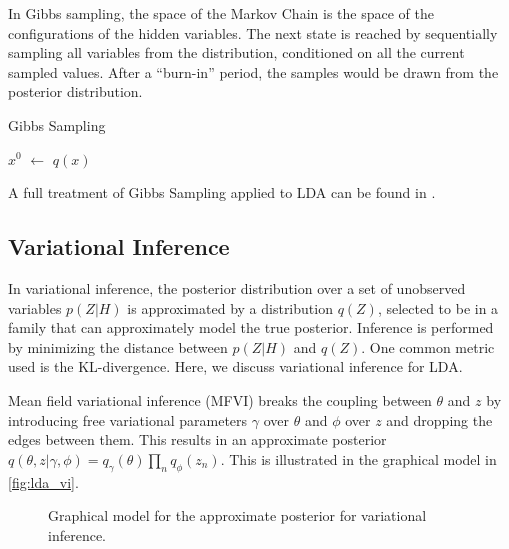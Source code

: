 \documentclass[letterpaper]{article}
\begin{document}
In Gibbs sampling, the space of the Markov Chain is the space of the
configurations of the hidden variables. The next state is reached by
sequentially sampling all variables from the distribution, conditioned
on all the current sampled values. After a ``burn-in'' period, the
samples would be drawn from the posterior distribution.

\begin{algorithm}
\caption{Gibbs Sampling}\label{alg:gibbs}
\begin{algorithmic}[1]
  \State $x^{0}$ $\gets$ $q(x)$
  \EndFor
  \EndFor
\end{algorithmic}
\end{algorithm}

A full treatment of Gibbs Sampling applied to LDA can be found in
\cite{griffiths2002gibbs}.

\subsection{Variational Inference}
\label{subsec:vi}
In variational inference, the posterior distribution over a set of
unobserved variables $p(Z|H)$ is approximated by a distribution
$q(Z)$, selected to be in a family that can approximately model the
true posterior. Inference is performed by minimizing the distance
between $p(Z|H)$ and $q(Z)$. One common metric used is the
KL-divergence. Here, we discuss variational inference for LDA.

Mean field variational inference (MFVI) breaks the coupling between
$\theta$ and $z$ by introducing free variational parameters $\gamma$
over $\theta$ and $\phi$ over $z$ and dropping the edges between them.
This results in an approximate posterior $q(\theta, z | \gamma, \phi)
= q_\gamma(\theta)\prod_nq_\phi(z_n)$. This is illustrated in the
graphical model in \autoref{fig:lda_vi}.

\begin{figure}[ht]
  \centering
  \caption{\label{fig:lda_vi} Graphical model for the approximate
    posterior for variational inference.}
\end{figure}
\end{document}
